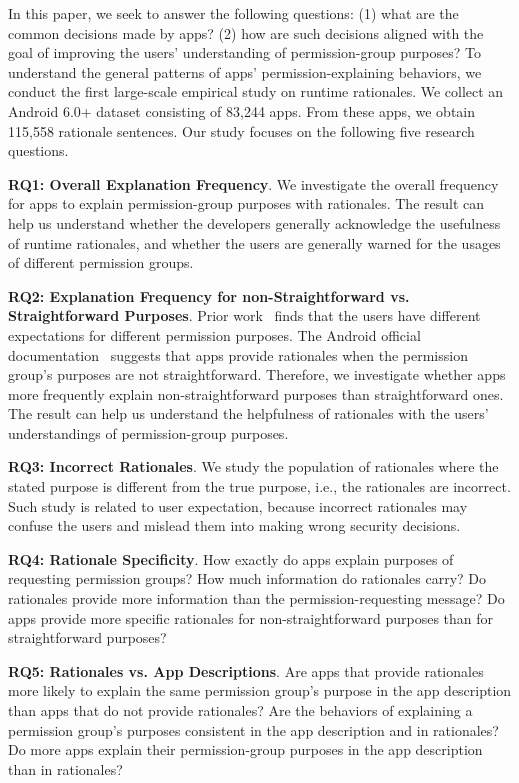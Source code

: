 In this paper, we seek to answer the following questions: (1) what are the common decisions made by apps? (2) how are such decisions aligned with the goal of improving the users' understanding of permission-group purposes? 
To understand the general patterns of apps' permission-explaining behaviors, we conduct the first large-scale empirical study on runtime rationales. 
We collect an Android 6.0+ dataset consisting of 83,244 apps. 
From these apps, we obtain 115,558 rationale sentences. 
Our study focuses on the following five research questions.

{\bf RQ1: Overall Explanation Frequency}. We investigate the overall frequency for apps to explain permission-group purposes with rationales. The result can help us understand whether the developers generally acknowledge the usefulness of runtime rationales, and whether the users are generally warned for the usages of different permission groups. 

{\bf RQ2: Explanation Frequency for non-Straightforward vs. Straightforward Purposes}. Prior work~\cite{conf/codaspy/JingAZH14,conf/huc/LinSALHZ12} finds that the users have different expectations for different permission purposes. The Android official documentation~\cite{shouldshow} suggests that apps provide rationales when the permission group's purposes are not straightforward. Therefore, we investigate whether apps more frequently explain non-straightforward purposes than straightforward ones. The result can help us understand the helpfulness of rationales with the users' understandings of permission-group purposes. 

{\bf RQ3: Incorrect Rationales}. We study the population of rationales where the stated purpose is different from the true purpose, i.e., the rationales are incorrect. 
Such study is related to user expectation, because incorrect rationales may confuse the users and mislead them into making wrong security decisions. 

{\bf RQ4: Rationale Specificity}. How exactly do apps explain purposes of requesting permission groups? How much information do rationales carry? 
Do rationales provide more information than the permission-requesting message? 
Do apps provide more specific rationales for non-straightforward purposes than for straightforward purposes? 

{\bf RQ5: Rationales vs. App Descriptions}. Are apps that provide rationales more likely to explain the same permission group's purpose in the app description than apps that do not provide rationales? 
Are the behaviors of explaining a permission group's purposes consistent in the app description and in rationales? Do more apps explain their permission-group purposes in the app description than in rationales?

